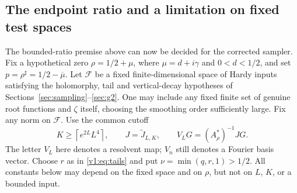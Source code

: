 \documentclass[11pt]{article}
\theoremstyle{remark}
\newcommand{\Jr}{\widetilde J}
\begin{document}
\subsection*{The endpoint ratio and a limitation on fixed test spaces}
The bounded-ratio premise above can now be decided for the corrected
sampler. Fix a hypothetical zero $\rho=1/2+\mu$, where
$\mu=d+i\gamma$ and $0<d<1/2$, and set
$p=\rho^\sharp=1/2-\overline\mu$. Let $\mathcal F$ be a fixed
finite-dimensional space of Hardy inputs satisfying the holomorphy,
tail and vertical-decay hypotheses of Sections~\ref{sec:sampling}--\ref{sec:g2}.
One may include any fixed finite set of genuine root functions and
$\zeta$ itself, choosing the smoothing order sufficiently large.
Fix any norm on $\mathcal F$. Use the common cutoff
\[
 K\ge\left\lceil e^{2L}L^4\right\rceil,
 \qquad J=\Jr_{L,K},\qquad
 V_LG=(A_\rho^*)^{-1}JG.
\]
The letter $V_L$ here denotes a resolvent map; $V_n$ still denotes a
Fourier basis vector. Choose $r$ as in \eqref{v1:eq:tails} and put
$\nu=\min(q,r,1)>1/2$. All constants below may depend on the fixed
space and on $\rho$, but not on $L$, $K$, or a bounded input.
\end{document}
